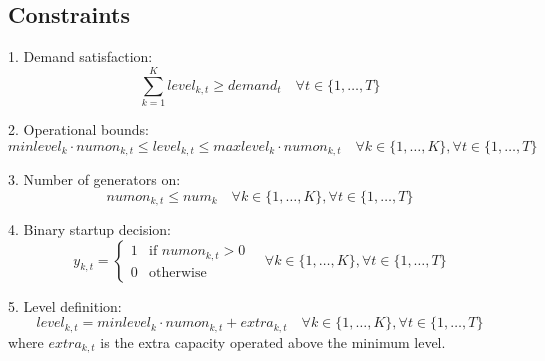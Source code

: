 \documentclass{article}
\begin{document}
\subsection*{Constraints}
1. Demand satisfaction:
\[
\sum_{k=1}^{K} level_{k,t} \geq demand_t \quad \forall t \in \{1, \ldots, T\}
\]

2. Operational bounds:
\[
minlevel_k \cdot numon_{k,t} \leq level_{k,t} \leq maxlevel_k \cdot numon_{k,t} \quad \forall k \in \{1, \ldots, K\}, \forall t \in \{1, \ldots, T\}
\]

3. Number of generators on:
\[
numon_{k,t} \leq num_k \quad \forall k \in \{1, \ldots, K\}, \forall t \in \{1, \ldots, T\}
\]

4. Binary startup decision:
\[
y_{k,t} = 
\begin{cases} 
1 & \text{if } numon_{k,t} > 0 \\
0 & \text{otherwise}
\end{cases} \quad \forall k \in \{1, \ldots, K\}, \forall t \in \{1, \ldots, T\}
\]

5. Level definition:
\[
level_{k,t} = minlevel_k \cdot numon_{k,t} + extra_{k,t} \quad \forall k \in \{1, \ldots, K\}, \forall t \in \{1, \ldots, T\}
\]
where \(extra_{k,t}\) is the extra capacity operated above the minimum level.
\end{document}
